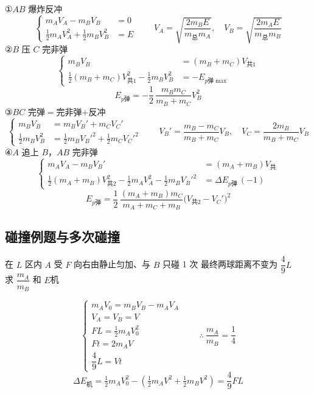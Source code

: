 \begin{problem}[{[2]}]
\begin{solution}
①$AB$ 爆炸反冲
\[
\left\{\begin{aligned}
m_AV_A-m_BV_B&=0 %
\\
\tfrac12m_AV_A^2+\tfrac12m_BV_B^2&=E
\end{aligned}\right.
\qquad
V_A=\sqrt{\frac{2m_BE}{m_{\text{总}}m_A}},\quad V_B=\sqrt{\frac{2m_AE}{m_{\text{总}}m_B}}
\]
②$B$ 压 $C$ 完非弹
\[
\left\{\begin{aligned}
m_BV_B&=(m_B+m_C)V_{\text{共}1}\\
\tfrac12(m_B+m_C)V_{\text{共}1}^2-\tfrac12m_BV_B^2&=-E_{p\text{弹}\max}
\end{aligned}\right.
\]
\[
E_{p\text{弹}}=-\frac12\,\frac{m_Bm_C}{m_B+m_C}V_B^2 %
\]
③$BC$ 完弹$=$完非弹$+$反冲
\[
\left\{\begin{aligned}
m_BV_B&=m_BV_B'+m_CV_C'\\
\tfrac12m_BV_B^2&=\tfrac12m_BV_B'^2+\tfrac12m_CV_C'^2
\end{aligned}\right.
\qquad
V_B'=\frac{m_B-m_C}{m_B+m_C}V_B,\quad V_C=\frac{2m_B}{m_B+m_C}V_B %
\]
④$A$ 追上 $B$，$AB$ 完非弹
\[
\left\{\begin{aligned}
m_AV_A-m_BV_B'&=(m_A+m_B)V_{\text{共}}\\
\tfrac12(m_A+m_B)V_{\text{共}2}^2-\tfrac12m_AV_A^2-\tfrac12m_BV_B'^2&=\Delta E_{p\text{弹}}\,(-1)
\end{aligned}\right.
\]
\[
E_{p\text{弹}}=\frac12\,\frac{(m_A+m_B)m_C}{m_A+m_C+m_B}\bigl(V_{\text{共}2}-V_C'\bigr)^2
\]
\end{solution}
\end{problem}

\subsection{碰撞例题与多次碰撞}
\begin{problem}
在 $L$ 区内 $A$ 受 $F$ 向右由静止匀加、与 $B$ 只碰 1 次 最终两球距离不变为 $\dfrac49L$\\
求 $\dfrac{m_A}{m_B}$ 和 $E$机
\begin{solution}
\[
\begin{cases}
m_AV_0=m_BV_B-m_AV_A\\
V_A=V_B=V\\
FL=\tfrac12 m_AV_0^2\\
Ft=2m_AV\\
\dfrac49L=Vt
\end{cases}
\qquad\therefore\ \dfrac{m_A}{m_B}=\dfrac14
\]
\[
\Delta E_{\text{机}}=\tfrac12 m_AV_0^2-\left(\tfrac12 m_AV^2+\tfrac12 m_BV^2\right)=\dfrac49FL
\]
\end{solution}
\end{problem}

